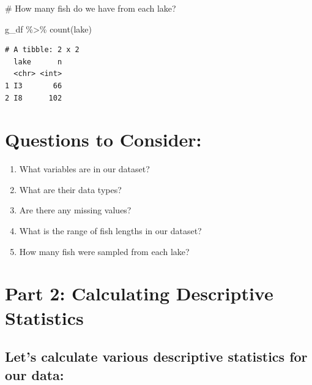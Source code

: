 \documentclass[
]{article}
\newenvironment{Shaded}{}{}
\newcommand{\CommentTok}[1]{\textcolor[rgb]{0.42,0.45,0.49}{#1}}
\newcommand{\FunctionTok}[1]{\textcolor[rgb]{0.44,0.26,0.76}{#1}}
\newcommand{\NormalTok}[1]{\textcolor[rgb]{0.14,0.16,0.18}{#1}}
\newcommand{\SpecialCharTok}[1]{\textcolor[rgb]{0.00,0.36,0.77}{#1}}
\providecommand{\tightlist}{%
  \setlength{\itemsep}{0pt}\setlength{\parskip}{0pt}}\usepackage{longtable,booktabs,array}
\begin{document}
\begin{Shaded}
\begin{Highlighting}[]
\CommentTok{\# How many fish do we have from each lake?}

\NormalTok{g\_df }\SpecialCharTok{\%\textgreater{}\%}
  \FunctionTok{count}\NormalTok{(lake) }
\end{Highlighting}
\end{Shaded}

\begin{verbatim}
# A tibble: 2 x 2
  lake      n
  <chr> <int>
1 I3       66
2 I8      102
\end{verbatim}

\section{Questions to Consider:}\label{questions-to-consider}

\begin{enumerate}
\def\labelenumi{\arabic{enumi}.}
\tightlist
\item
  What variables are in our dataset?
\item
  What are their data types?
\item
  Are there any missing values?
\item
  What is the range of fish lengths in our dataset?
\item
  How many fish were sampled from each lake?
\end{enumerate}

\section{Part 2: Calculating Descriptive
Statistics}\label{part-2-calculating-descriptive-statistics}

\subsection{Let's calculate various descriptive statistics for our
data:}\label{lets-calculate-various-descriptive-statistics-for-our-data}

\subsection{}\label{section-1}
\end{document}
